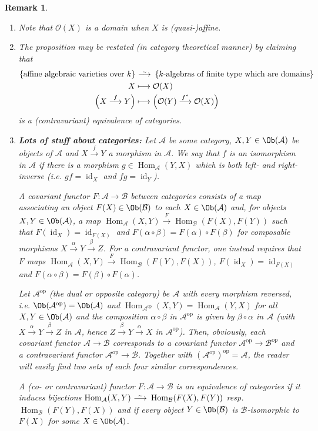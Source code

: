 \documentclass[DIV=14,parskip=full,pointednumbers]{scrartcl}
\newenvironment{alphanumerate}{\begin{enumerate}[label={$(\alph*)$},ref=\curthm]}{\end{enumerate}}
\theoremstyle{cthm}
\theoremstyle{cvarthm}
\theoremstyle{cdef}
\newtheorem*{rem*}{Remark}
\newcommand{\Aa}{\mathcal{A}}
\newcommand{\Bb}{\mathcal{B}}
\newcommand{\Oo}{\mathcal{O}}
\newcommand{\Hom}{\operatorname{Hom}}
\newcommand{\id}{\operatorname{id}}
\newcommand{\op}{^{\operatorname{op}}}
\newcommand{\longto}{\longrightarrow}
\newcommand{\isomorphism}{
	\tikz[baseline=(a.base)] \node (a) at (0,0) {$\longrightarrow$} node[above=-0.25ex] {\tiny $\sim$};}
\newcommand{\morphism}[1][]{\overset{#1}{\longto}}
\begin{document}
	\begin{rem*}
		\begin{alphanumerate}
			\item Note that $\Oo(X)$ is a domain when $X$ is (quasi-)affine.
			\item The proposition may be restated (in category theoretical manner) by claiming that
			\begin{align*}
				\left\{\text{affine algebraic varieties}\text{ over }k\right\}&\isomorphism\left\{k\text{-algebras of finite type which are domains}\right\}\\
				X&\longmapsto \Oo(X)\\
				\left(X\morphism[f]Y\right)&\longmapsto \left(\Oo(Y)\morphism[f^*]\Oo(X)\right)
			\end{align*}
			is a (contravariant) \emph{equivalence of categories}.
			\item \textbf{Lots of stuff about categories:} Let $\Aa$ be some category, $X,Y\in\Ob(\Aa)$ be objects of $\Aa$ and $X\morphism[f]Y$ a morphism in $\Aa$. We say that $f$ is an \emph{isomorphism} in $\Aa$ if there is a morphism $g\in\Hom_\Aa(Y,X)$ which is both left- and right-inverse (i.e. $gf=\id_X$ and $fg=\id_Y$).
			
			A \emph{covariant functor} $F\colon\Aa\to\Bb$ between categories consists of a map associating an object $F(X)\in\Ob(\Bb)$ to each $X\in\Ob(\Aa)$ and, for objects $X,Y\in\Ob(\Aa)$, a map $\Hom_\Aa(X,Y)\morphism[F]\Hom_\Bb(F(X),F(Y))$ such that $F(\id_X)=\id_{F(X)}$ and $F(\alpha\circ\beta)=F(\alpha)\circ F(\beta)$ for composable morphisms $X\morphism[\alpha]Y\morphism[\beta]Z$. For a \emph{contravariant functor}, one instead requires that $F$ maps $\Hom_\Aa(X,Y)\morphism[F]\Hom_\Bb(F(Y),F(X))$, $F(\id_X)=\id_{F(X)}$ and $F(\alpha\circ\beta)=F(\beta)\circ F(\alpha)$.
			
			Let $\Aa\op$ (the \emph{dual} or \emph{opposite} category) be $\Aa$ with every morphism reversed, i.e. $\Ob(\Aa\op)=\Ob(\Aa)$ and $\Hom_{\Aa\op}(X,Y)=\Hom_\Aa(Y,X)$ for all $X,Y\in\Ob(\Aa)$ and the composition $\alpha\circ\beta$ in $\Aa\op$ is given by $\beta\circ\alpha$ in $\Aa$ (with $X\morphism[\alpha]Y\morphism[\beta]Z$ in $\Aa$, hence $Z\morphism[\beta]Y\morphism[\alpha]X$ in $\Aa\op$). Then, obviously, each covariant functor $\Aa\to\Bb$ corresponds to a covariant functor $\Aa\op\to\Bb\op$ and a contravariant functor $\Aa\op\to\Bb$. Together with $(\Aa\op)\op=\Aa$, the reader will easily find two sets of each four similar correspondences.
			
			A (co- or contravariant) functor $F\colon\Aa\to\Bb$ is an \emph{equivalence of categories} if it induces bijections $\Hom_\Aa(X,Y)\isomorphism\Hom_\Bb(F(X),F(Y))$ resp. $\Hom_\Bb(F(Y),F(X))$ and if every object $Y\in\Ob(\Bb)$ is $\Bb$-isomorphic to $F(X)$ for some $X\in\Ob(\Aa)$.
			

\end{alphanumerate}
\end{rem*}
\end{document}
